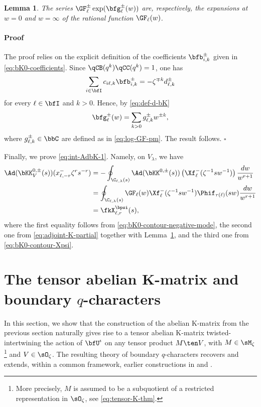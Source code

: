 \documentclass[reqno]{amsart}
\numberwithin{equation}{section}
\newtheorem*{lemma}{Lemma}
\newenvironment{pf}{\medskip\paragraph{{\sc Proof}}}{\hfill$\square$\par\medskip}
\begin{document}
\begin{lemma}\label{lem:b-gamma}
The series $\GF_{\ell}^{\pm}\exp(\bfg_\ell^\pm(w))$ are, respectively, the expansions at $w=0$ and $w=\infty$ of the rational function $\GF_{\ell}(w)$.
\end{lemma}

\begin{pf}
The proof relies on the explicit definition of the coefficients $\bfb_{i,k}^\pm$
given in \eqref{eq:bK0-coefficients}. Since
$\qCB(q^k)\qCC(q^k)=1$, one has
\begin{equation}\label{eq:linear-system-bK-b}
\sum_{i\in\bfI}c_{i\ell,k}\bfb_{i,k}^\pm
=
-\zeta^{\mp k}d_{\ell,k}^\pm
\end{equation}
for every $\ell\in\bfI$ and $k>0$. Hence, by \eqref{eq:def-d-bK}
\[\bfg^\pm_\ell(w)=\sum_{k>0}g_{\ell,k}^\pm w^{\pm k},\]
where $g^\pm_{\ell, k}\in\bbC$ are defined as in \eqref{eq:log-GF-pm}.
The result follows.
\end{pf}

Finally, we prove \eqref{eq:int-AdbK-1}. Namely, on $V_\lambda$, we have
\begin{align}
\Ad(\bKK_V^{0,\pm}(s))
(	x^-_{\ell,-r}\zeta^rs^{-r})
&=
-\oint_{\C_{\ell,\lambda}(s)}
\Ad(\bKK^{0,\pm}(s))
\left(\Xf^-_\ell(\zeta^{-1}sw^{-1})\right)
\frac{dw}{w^{r+1}}\\
&=
\oint_{\C_{\ell,\lambda}(s)}
\GF_\ell(w)\Xf^-_\ell(\zeta^{-1}sw^{-1})
\Phif_{\tau(\ell)}(sw)\frac{dw}{w^{r+1}}\\
&=
\fkX^{\bpsi}_{\ell,r}(s),
\end{align}
where the first equality follows from \eqref{eq:bK0-contour-negative-mode}, the second one from \eqref{eq:adjoint-K-partial} together with Lemma~\ref{lem:b-gamma}, and the third one from \eqref{eq:bK0-contour-Xpsi}.

\section{The tensor abelian K-matrix and boundary $q$-characters}
\label{s:tensor-abelian-K-matrix}
In this section, we show that the construction of the abelian K-matrix from the previous section naturally gives rise to a tensor abelian K-matrix twisted-intertwining the action of $\bfU^\imath$ on any tensor product $M\ten V$, with $M\in\sM_\zeta$
\footnote{More precisely, $M$ is assumed to be a subquotient of a restricted representation in $\sO_\zeta$, see \ref{eq:tensor-K-thm}.} and $V\in\sO_\zeta$. 
The resulting theory of boundary $q$-characters recovers and extends, within a common framework, earlier constructions in \cite{appel-vlaar-25c} and \cite{Przez-23, li-przezdziecki-25, LP-eval, li-przezdziecki-26}.
\end{document}
